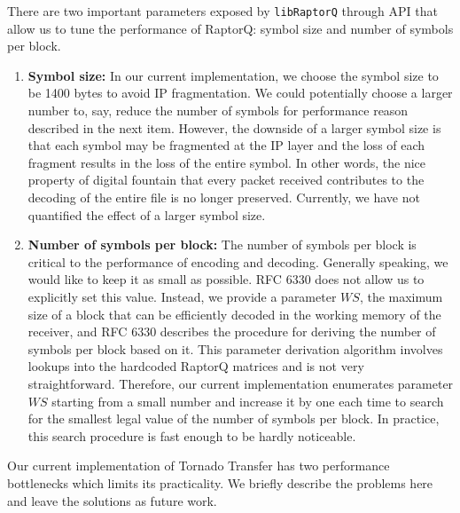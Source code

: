 \documentclass{sig-alternate-10pt}
\begin{document}
There are two important parameters exposed by \texttt{libRaptorQ} through API that allow us to tune the performance of RaptorQ: symbol size and number of symbols per block.
\begin{enumerate}[label=(\alph*)]
\item \textbf{Symbol size:} In our current implementation, we choose the symbol size to be 1400 bytes to avoid IP fragmentation. We could potentially choose a larger number to, say, reduce the number of symbols for performance reason  described in the next item. However, the downside of a larger symbol size is that each symbol may be fragmented at the IP layer and the loss of each fragment results in the loss of the entire symbol. In other words, the nice property of digital fountain that every packet received contributes to the decoding of the entire file is no longer preserved. Currently, we have not quantified the effect of a larger symbol size.
\item \textbf{Number of symbols per block:} The number of symbols per block is critical to the performance of encoding and decoding. Generally speaking, we would like to keep it as small as possible. RFC 6330 does not allow us to explicitly set this value. Instead, we provide a parameter $WS$, the maximum size of a block that can be efficiently decoded in the working memory of the receiver, and RFC 6330 describes the procedure for deriving the number of symbols per block based on it. This parameter derivation algorithm involves lookups into the hardcoded RaptorQ matrices and is not very straightforward. Therefore, our current implementation enumerates parameter $WS$ starting from a small number and increase it by one each time to search for the smallest legal value of the number of symbols per block. In practice, this search procedure is fast enough to be hardly noticeable.
\end{enumerate}

Our current implementation of Tornado Transfer has two performance bottlenecks which limits its practicality. We briefly describe the problems here and leave the solutions as future work.
\end{document}

